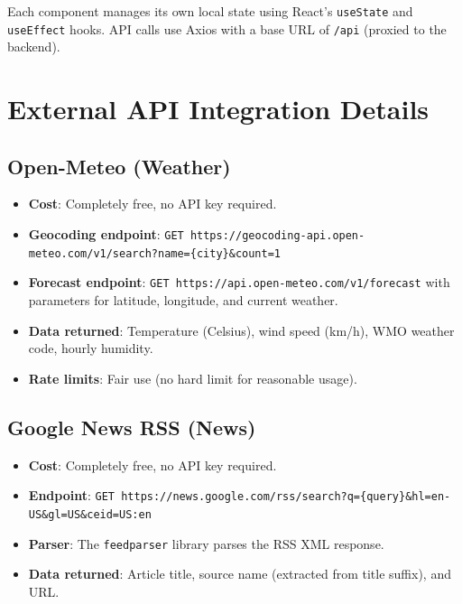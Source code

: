 \documentclass[12pt, a4paper]{article}
\begin{document}
Each component manages its own local state using React's \texttt{useState} and \texttt{useEffect} hooks. API calls use Axios with a base URL of \texttt{/api} (proxied to the backend).

\section{External API Integration Details}

\subsection{Open-Meteo (Weather)}

\begin{itemize}[leftmargin=2em]
  \item \textbf{Cost}: Completely free, no API key required.
  \item \textbf{Geocoding endpoint}: \texttt{GET https://geocoding-api.open-meteo.com/v1/search?name=\{city\}\&count=1}
  \item \textbf{Forecast endpoint}: \texttt{GET https://api.open-meteo.com/v1/forecast} with parameters for latitude, longitude, and current weather.
  \item \textbf{Data returned}: Temperature (Celsius), wind speed (km/h), WMO weather code, hourly humidity.
  \item \textbf{Rate limits}: Fair use (no hard limit for reasonable usage).
\end{itemize}

\subsection{Google News RSS (News)}

\begin{itemize}[leftmargin=2em]
  \item \textbf{Cost}: Completely free, no API key required.
  \item \textbf{Endpoint}: \texttt{GET https://news.google.com/rss/search?q=\{query\}\&hl=en-US\&gl=US\&ceid=US:en}
  \item \textbf{Parser}: The \texttt{feedparser} library parses the RSS XML response.
  \item \textbf{Data returned}: Article title, source name (extracted from title suffix), and URL.
\end{itemize}
\end{document}

